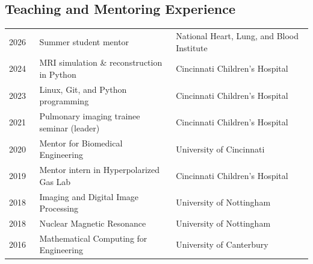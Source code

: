 \documentclass[12pt,]{scrartcl}
\begin{document}
\newpage

\subsection{Teaching and Mentoring Experience}\label{teaching}

\begin{table}[!h]
{\def\arraystretch{1.5}\tabcolsep=0pt
\begin{tabular}{p{0.10\linewidth}p{0.45\linewidth}p{0.45\linewidth}}

2026 & Summer student mentor & National Heart, Lung, and Blood Institute \\ 

2024 & MRI simulation \& reconstruction in Python & Cincinnati Children's Hospital \\

2023 & Linux, Git, and Python programming & Cincinnati Children's Hospital \\

2021 & Pulmonary imaging trainee seminar (leader) & Cincinnati Children's Hospital\\

2020 & Mentor for Biomedical Engineering & University of Cincinnati\\

 2019 & Mentor intern in Hyperpolarized Gas Lab & Cincinnati Children's Hospital\\
  
  2018 & Imaging and Digital Image Processing & University of Nottingham \\
  
  2018 & Nuclear Magnetic Resonance & University of Nottingham  \\

 2016 & Mathematical Computing for Engineering & University of Canterbury  \\
  
\end{tabular}%
}
\end{table}
\end{document}
